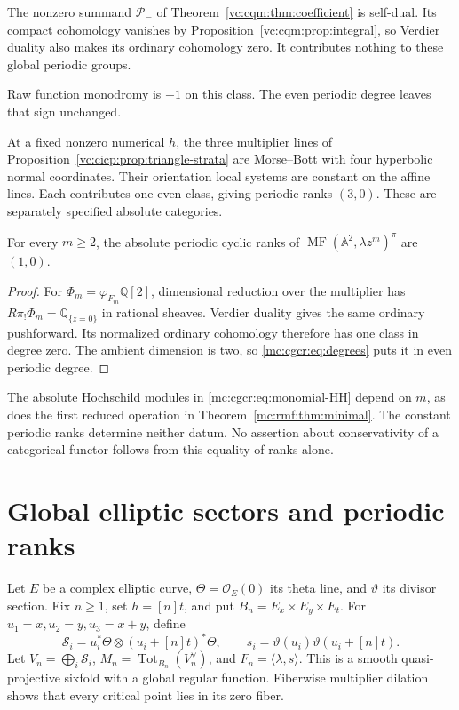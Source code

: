 The nonzero summand $\mathcal P_-$ of
Theorem~\ref{vc:cqm:thm:coefficient} is self-dual.
Its compact cohomology vanishes by
Proposition~\ref{vc:cqm:prop:integral}, so Verdier duality
also makes its ordinary cohomology zero.
It contributes nothing to these global periodic groups.

Raw function monodromy is $+1$ on this class. The even
periodic degree leaves that sign unchanged.

At a fixed
nonzero numerical $h$, the three multiplier lines of
Proposition~\ref{vc:cicp:prop:triangle-strata} are Morse--Bott
with four hyperbolic normal coordinates. Their orientation
local systems are constant on the affine lines. Each
contributes one even class, giving periodic ranks $(3,0)$.
These are separately specified absolute categories.

\begin{corollary}\label{mc:cor:monomial-periodic}
For every $m\ge2$, the absolute periodic cyclic ranks
of $\operatorname{MF}(\mathbb A^2,\lambda z^m)^\pi$
are $(1,0)$.
\end{corollary}

\begin{proof}
For $\Phi_m=\varphi_{F_m}\mathbb Q[2]$, dimensional
reduction over the multiplier has
$R\pi_!\Phi_m=\mathbb Q_{\{z=0\}}$ in rational sheaves.
Verdier duality gives the same ordinary pushforward.
Its normalized ordinary cohomology therefore has one
class in degree zero. The ambient dimension is two,
so \eqref{mc:cgcr:eq:degrees} puts it in even periodic degree.
\end{proof}

The absolute Hochschild modules in
\eqref{mc:cgcr:eq:monomial-HH} depend on $m$, as does the
first reduced operation in Theorem~\ref{mc:rmf:thm:minimal}.
The constant periodic ranks determine neither datum.
No assertion about conservativity of a categorical functor
follows from this equality of ranks alone.

\section{Global elliptic sectors and periodic ranks}

Let $E$ be a complex elliptic curve,
$\Theta=\mathcal O_E(0)$ its theta line, and $\vartheta$
its divisor section. Fix $n\ge1$, set $h=[n]t$, and put
$B_n=E_x\times E_y\times E_t$.
For $u_1=x,u_2=y,u_3=x+y$, define
\[
 \mathcal S_i=u_i^*\Theta\otimes(u_i+[n]t)^*\Theta,
 \qquad s_i=\vartheta(u_i)\vartheta(u_i+[n]t).
\]
Let $V_n=\bigoplus_i\mathcal S_i$,
$M_n=\operatorname{Tot}_{B_n}(V_n^\vee)$, and
$F_n=\langle\lambda,s\rangle$.
This is a smooth quasi-projective sixfold with a global
regular function. Fiberwise multiplier dilation shows
that every critical point lies in its zero fiber.


